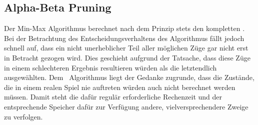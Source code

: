 \subsection{Alpha-Beta Pruning}
Der Min-Max Algorithmus berechnet nach dem Prinzip  stets den kompletten \gtree. Bei der Betrachtung des Entscheidungsverhaltens des Algorithmus fällt jedoch schnell auf, dass ein nicht unerheblicher Teil aller möglichen Züge gar nicht erst in Betracht gezogen wird. Dies geschieht aufgrund der Tatsache, dass diese Züge in einem schlechteren Ergebnis resultieren würden als die letztendlich ausgewählten.\newline
Dem \abp\ Algorithmus liegt der Gedanke zugrunde, dass die Zustände, die in einem realen Spiel nie auftreten würden auch nicht berechnet werden müssen. Damit steht die dafür regulär erforderliche Rechenzeit und der entsprechende Speicher dafür zur Verfügung andere, vielversprechendere Zweige zu verfolgen.
